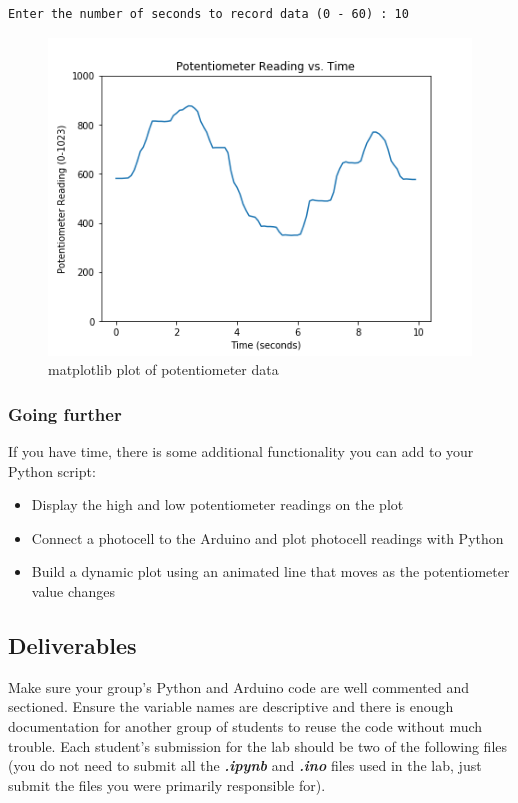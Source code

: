 \documentclass[11pt]{article}
\begin{document}
\begin{verbatim}
Enter the number of seconds to record data (0 - 60) : 10
\end{verbatim}

\begin{figure}
\centering
\includegraphics{images/potentiometer_reading.png}
\caption{matplotlib plot of potentiometer data}
\end{figure}

    \hypertarget{going-further}{%
\subsubsection{Going further}\label{going-further}}

If you have time, there is some additional functionality you can add to
your Python script:

\begin{itemize}
\item
  Display the high and low potentiometer readings on the plot
\item
  Connect a photocell to the Arduino and plot photocell readings with
  Python
\item
  Build a dynamic plot using an animated line that moves as the
  potentiometer value changes
\end{itemize}

    \hypertarget{deliverables}{%
\subsection{Deliverables}\label{deliverables}}

Make sure your group's Python and Arduino code are well commented and
sectioned. Ensure the variable names are descriptive and there is enough
documentation for another group of students to reuse the code without
much trouble. Each student's submission for the lab should be two of the
following files (you do not need to submit all the
\textbf{\emph{.ipynb}} and \textbf{\emph{.ino}} files used in the lab,
just submit the files you were primarily responsible for).
\end{document}
